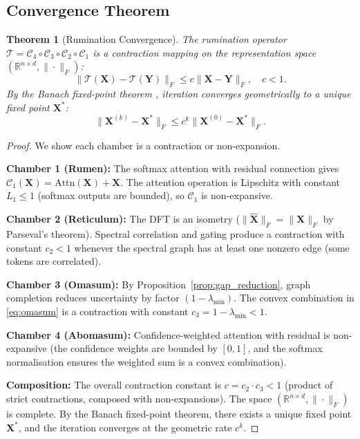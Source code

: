 \documentclass[twocolumn,10pt]{article}
\newtheorem{theorem}{Theorem}[section]
\theoremstyle{remark}
\newcommand{\Tcomp}{\mathcal{T}}
\newcommand{\chamber}[1]{\mathcal{C}_{#1}}
\begin{document}
\subsection{Convergence Theorem}

\begin{theorem}[Rumination Convergence]
\label{thm:convergence}
The rumination operator $\Tcomp = \chamber{4} \circ \chamber{3} \circ \chamber{2} \circ \chamber{1}$ is a contraction mapping on the representation space $(\mathbb{R}^{n \times d}, \|\cdot\|_F)$:
\begin{equation}
    \|\Tcomp(\mathbf{X}) - \Tcomp(\mathbf{Y})\|_F \leq c \|\mathbf{X} - \mathbf{Y}\|_F, \quad c < 1.
    \label{eq:contraction}
\end{equation}
By the Banach fixed-point theorem \cite{banach1922}, iteration converges geometrically to a unique fixed point $\mathbf{X}^*$:
\begin{equation}
    \|\mathbf{X}^{(k)} - \mathbf{X}^*\|_F \leq c^k \|\mathbf{X}^{(0)} - \mathbf{X}^*\|_F.
    \label{eq:convergence_rate}
\end{equation}
\end{theorem}

\begin{proof}
We show each chamber is a contraction or non-expansion.

\textbf{Chamber 1 (Rumen):} The softmax attention with residual connection gives $\chamber{1}(\mathbf{X}) = \text{Attn}(\mathbf{X}) + \mathbf{X}$.  The attention operation is Lipschitz with constant $L_1 \leq 1$ (softmax outputs are bounded), so $\chamber{1}$ is non-expansive.

\textbf{Chamber 2 (Reticulum):} The DFT is an isometry ($\|\hat{\mathbf{X}}\|_F = \|\mathbf{X}\|_F$ by Parseval's theorem).  Spectral correlation and gating produce a contraction with constant $c_2 < 1$ whenever the spectral graph has at least one nonzero edge (some tokens are correlated).

\textbf{Chamber 3 (Omasum):} By Proposition~\ref{prop:gap_reduction}, graph completion reduces uncertainty by factor $(1 - \lambda_{\min})$.  The convex combination in \eqref{eq:omasum} is a contraction with constant $c_3 = 1 - \lambda_{\min} < 1$.

\textbf{Chamber 4 (Abomasum):} Confidence-weighted attention with residual is non-expansive (the confidence weights are bounded by $[0, 1]$, and the softmax normalisation ensures the weighted sum is a convex combination).

\textbf{Composition:} The overall contraction constant is $c = c_2 \cdot c_3 < 1$ (product of strict contractions, composed with non-expansions).  The space $(\mathbb{R}^{n \times d}, \|\cdot\|_F)$ is complete.  By the Banach fixed-point theorem, there exists a unique fixed point $\mathbf{X}^*$, and the iteration converges at the geometric rate $c^k$.
\end{proof}
\end{document}
